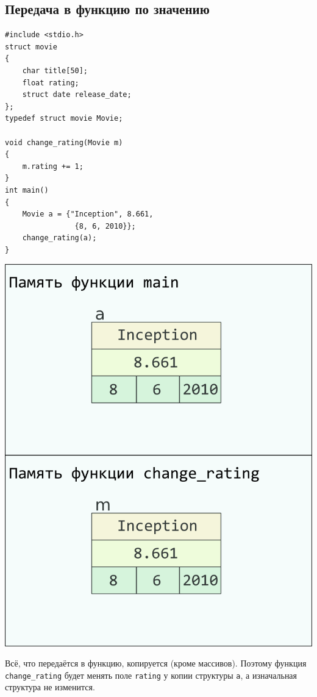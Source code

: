 \documentclass{article}
\begin{document}
\subsection*{Передача в функцию по значению}
\begin{multicols}{2}
\begin{lstlisting}
#include <stdio.h>
struct movie 
{
    char title[50];
    float rating;
    struct date release_date;
};
typedef struct movie Movie;

void change_rating(Movie m) 
{
    m.rating += 1;
}
int main() 
{
    Movie a = {"Inception", 8.661, 
                {8, 6, 2010}};
    change_rating(a);
}
\end{lstlisting}
\columnbreak
\begin{center}
\includegraphics[scale=0.8]{../images/pointer_schemes/function_by_value.png}
\end{center}
\end{multicols}
Всё, что передаётся в функцию, копируется (кроме массивов). Поэтому функция \texttt{change\_rating} будет менять
поле \texttt{rating} у копии структуры \texttt{a}, а изначальная структура не изменится.
\end{document}
